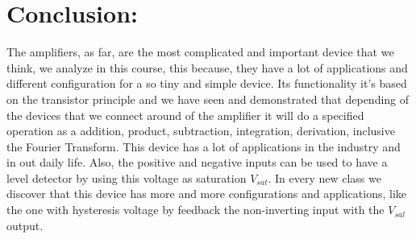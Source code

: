 \section{Conclusion:}

The amplifiers, as far, are the most complicated and important device that we think, we analyze in this course, this because, they have a lot of applications and different configuration for a so tiny and simple device. Its functionality it's based on the transistor principle and we have seen and demonstrated that depending of the devices that we connect around of the amplifier it will do a specified operation as a addition, product, subtraction, integration, derivation, inclusive the Fourier Transform. This device has a lot of applications in the industry and in out daily life. Also, the positive and negative inputs can be used to have a level detector by using this voltage as saturation $V_{sat}$. In every new class we discover that this device has more and more configurations and applications, like the one with hysteresis voltage by feedback the non-inverting input with the $V_{sal}$ output.

\pagebreak